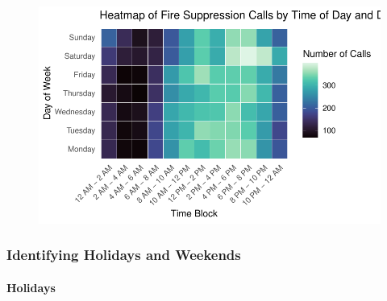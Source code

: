 \documentclass[
  letterpaper,
  DIV=11,
  numbers=noendperiod]{scrartcl}
\let\oldparagraph\paragraph
\renewcommand{\paragraph}[1]{\oldparagraph{#1}\mbox{}}
\begin{document}
\begin{figure}[H]

{\centering \includegraphics{Report_files/figure-pdf/unnamed-chunk-5-1.pdf}

}

\end{figure}

\hypertarget{identifying-holidays-and-weekends}{%
\subsubsection{Identifying Holidays and
Weekends}\label{identifying-holidays-and-weekends}}

\hypertarget{holidays}{%
\paragraph{Holidays}\label{holidays}}
\end{document}

